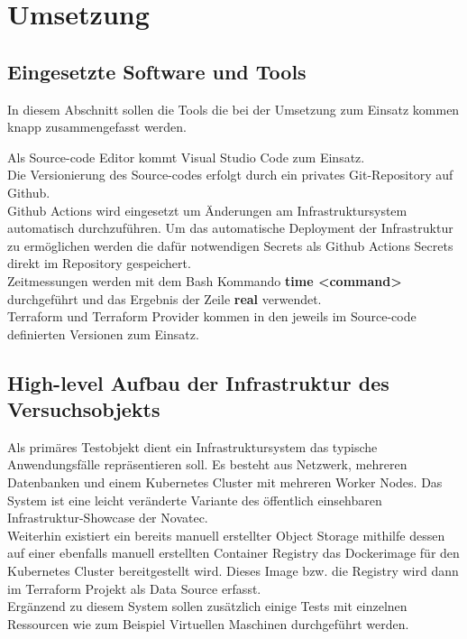 \section{Umsetzung}

\subsection{Eingesetzte Software und Tools}

In diesem Abschnitt sollen die Tools die bei der Umsetzung zum Einsatz
kommen knapp zusammengefasst werden.

Als Source-code Editor kommt Visual Studio Code zum Einsatz.\\
Die Versionierung des Source-codes erfolgt durch ein privates
Git-Repository auf Github.\\
Github Actions wird eingesetzt um Änderungen
am Infrastruktursystem automatisch durchzuführen. Um das automatische
Deployment der Infrastruktur zu ermöglichen werden die dafür notwendigen
Secrets als Github Actions Secrets direkt im Repository gespeichert.\\
Zeitmessungen werden mit dem Bash Kommando \textbf{time <command>}
durchgeführt und das Ergebnis der Zeile \textbf{real} verwendet.\\
Terraform und Terraform Provider kommen in den jeweils im Source-code
definierten Versionen zum Einsatz.

\subsection{High-level Aufbau der Infrastruktur des Versuchsobjekts}

Als primäres Testobjekt dient ein Infrastruktursystem das typische Anwendungsfälle
repräsentieren soll. Es besteht aus Netzwerk, mehreren Datenbanken und 
einem Kubernetes Cluster mit mehreren Worker Nodes. Das System ist eine
leicht veränderte Variante des öffentlich einsehbaren
Infrastruktur-Showcase der Novatec.\\
Weiterhin existiert ein bereits manuell erstellter Object Storage mithilfe
dessen auf einer ebenfalls manuell erstellten Container Registry das
Dockerimage für den Kubernetes Cluster bereitgestellt wird. Dieses Image
bzw. die Registry wird dann im Terraform Projekt als Data Source erfasst.\\
Ergänzend zu diesem System sollen 
zusätzlich einige Tests mit einzelnen Ressourcen wie zum Beispiel
Virtuellen Maschinen durchgeführt werden.

